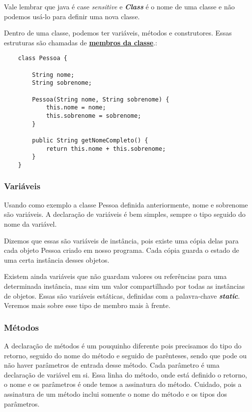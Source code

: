 \documentclass[12pt]{article}
\begin{document}
Vale lembrar que java é case \textit{sensitive} e \textbf{\textit{Class}} é o nome de uma classe e não podemos usá-lo para definir uma nova classe.

Dentro de uma classe, podemos ter variáveis, métodos e construtores. Essas estruturas são chamadas de \underline{\textbf{membros da classe}}.:

\begin{lstlisting}
	class Pessoa {
		
		String nome;
		String sobrenome;
		
		Pessoa(String nome, String sobrenome) {
			this.nome = nome;
			this.sobrenome = sobrenome;
		}
		
		public String getNomeCompleto() {
			return this.nome + this.sobrenome;
		}
	}	
\end{lstlisting}

\subsubsection{Variáveis}

Usando como exemplo a classe Pessoa definida anteriormente, nome e sobrenome são variáveis. A declaração de variáveis é bem simples, sempre o tipo seguido do nome da variável.

Dizemos que essas são variáveis de instância, pois existe uma cópia delas para cada objeto Pessoa criado em nosso programa. Cada cópia guarda o estado de uma certa instância desses objetos.

Existem ainda variáveis que não guardam valores ou referências para uma determinada instância, mas sim um valor compartilhado por todas as instâncias de objetos. Essas são variáveis estáticas, definidas com a palavra-chave \textbf{\textit{static}}. Veremos mais sobre esse tipo de membro mais à frente.

\subsubsection{Métodos}

A declaração de métodos é um pouquinho diferente pois precisamos do tipo do retorno, seguido do nome do método e seguido de parênteses, sendo que pode ou não haver parâmetros de entrada desse método. Cada parâmetro é uma declaração de variável em si. Essa linha do método, onde está definido o retorno, o nome e os parâmetros é onde temos a assinatura do método. Cuidado, pois a assinatura de um método inclui somente o nome do método e os tipos dos parâmetros.
\end{document}
